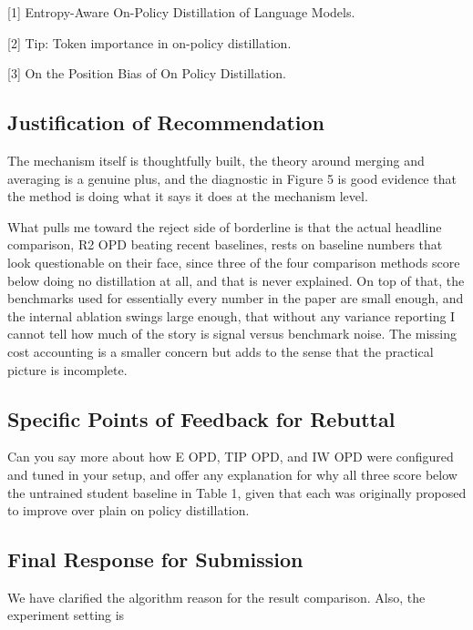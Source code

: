 [1] Entropy-Aware On-Policy Distillation of Language Models.

[2] Tip: Token importance in on-policy distillation.

[3] On the Position Bias of On Policy Distillation.

\subsection*{Justification of Recommendation}
The mechanism itself is thoughtfully built, the theory around merging and averaging is a genuine plus, and the diagnostic in Figure 5 is good evidence that the method is doing what it says it does at the mechanism level.

What pulls me toward the reject side of borderline is that the actual headline comparison, R2 OPD beating recent baselines, rests on baseline numbers that look questionable on their face, since three of the four comparison methods score below doing no distillation at all, and that is never explained. On top of that, the benchmarks used for essentially every number in the paper are small enough, and the internal ablation swings large enough, that without any variance reporting I cannot tell how much of the story is signal versus benchmark noise. The missing cost accounting is a smaller concern but adds to the sense that the practical picture is incomplete.

\subsection*{Specific Points of Feedback for Rebuttal}
Can you say more about how E OPD, TIP OPD, and IW OPD were configured and tuned in your setup, and offer any explanation for why all three score below the untrained student baseline in Table 1, given that each was originally proposed to improve over plain on policy distillation.

\par{}
\begin{responsebox}[frametitle={Response to Q1}]

\vspace*{2\baselineskip}
\end{responsebox}

\par{}
\subsection*{Final Response for Submission}
\par{}
\begin{responsebox}[frametitle={Final Response to Reviewer 5 (YgpD)},linecolor=finalgreen,backgroundcolor=finalfill]
We have clarified the algorithm reason for the result comparison. Also, the experiment setting is 


\vspace*{4\baselineskip}
\end{responsebox}

